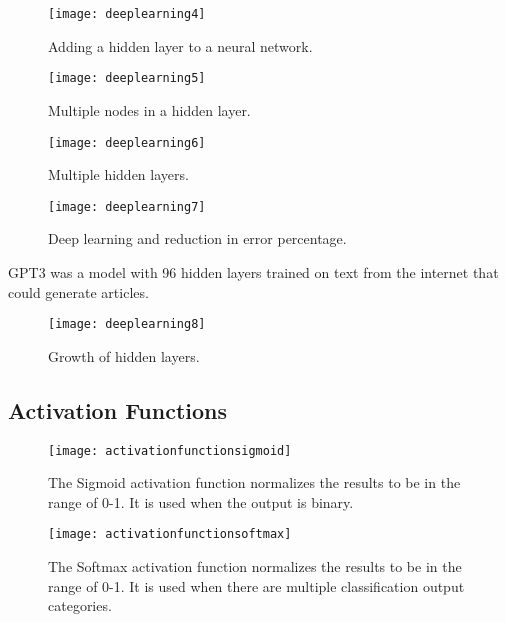  	\begin{figure}[h]
		\centering
		\texttt{[image: deeplearning4]}
		\caption[Adding a hidden layer to a neural network]{Adding a hidden layer to a neural network.}
		\label{fig:deeplearning4}
	\end{figure}

 	\begin{figure}[h]
		\centering
		\texttt{[image: deeplearning5]}
		\caption[Multiple nodes in a hidden layer]{Multiple nodes in a hidden layer.}
		\label{fig:deeplearning5}
	\end{figure}

 	\begin{figure}[h]
		\centering
		\texttt{[image: deeplearning6]}
		\caption[Multiple hidden layers]{Multiple hidden layers.}
		\label{fig:deeplearning6}
	\end{figure}

 	\begin{figure}[h]
		\centering
		\texttt{[image: deeplearning7]}
		\caption[Deep learning and reduction in error percentage]{Deep learning and reduction in error percentage.}
		\label{fig:deeplearning7}
	\end{figure}

GPT3 was a model with 96 hidden layers trained on text from the internet that could generate articles.

 	\begin{figure}[h]
		\centering
		\texttt{[image: deeplearning8]}
		\caption[Growth of hidden layers]{Growth of hidden layers.}
		\label{fig:deeplearning8}
	\end{figure}


	\subsection{Activation Functions}

 	\begin{figure}[h]
		\centering
		\texttt{[image: activationfunctionsigmoid]}
		\caption[The Sigmoid activation function]{The Sigmoid activation function normalizes the results to be in the range of 0-1.  It is used when the output is binary.}
		\label{fig:activationfunctionsigmoid}
	\end{figure}

 	\begin{figure}[h]
		\centering
		\texttt{[image: activationfunctionsoftmax]}
		\caption[The Softmax activation function]{The Softmax activation function normalizes the results to be in the range of 0-1.  It is used when there are multiple classification output categories.}
		\label{fig:activationfunctionsoftmax}
	\end{figure}

